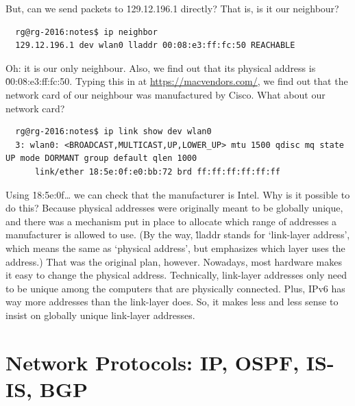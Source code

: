 But, can we send packets to \.{129.12.196.1} directly?
That is, is it our neighbour?
{\footnotesize
\begin{verbatim}
  rg@rg-2016:notes$ ip neighbor
  129.12.196.1 dev wlan0 lladdr 00:08:e3:ff:fc:50 REACHABLE
\end{verbatim}
}\noindent
Oh: it is our only neighbour.
Also, we find out that its physical address is \.{00:08:e3:ff:fc:50}.
Typing this in at \url{https://macvendors.com/},
  we find out that the network card of our neighbour was manufactured by Cisco.
What about our network card?
{\footnotesize
\begin{verbatim}
  rg@rg-2016:notes$ ip link show dev wlan0
  3: wlan0: <BROADCAST,MULTICAST,UP,LOWER_UP> mtu 1500 qdisc mq state UP mode DORMANT group default qlen 1000
      link/ether 18:5e:0f:e0:bb:72 brd ff:ff:ff:ff:ff:ff
\end{verbatim}
}\noindent
Using \.{18:5e:0f\dots} we can check that the manufacturer is Intel.
Why is it possible to do this?
Because physical addresses were originally meant to be globally unique,
  and there was a mechanism put in place to allocate
    which range of addresses a manufacturer is allowed to use.
(By the way, \.{lladdr} stands for `link-layer address',
  which means the same as `physical address',
  but emphasizes which layer uses the address.)
That was the original plan, however.
Nowadays, most hardware makes it easy to change the physical address.
Technically,
  link-layer addresses only need to be unique among the computers
  that are physically connected.
Plus, IPv6 has way more addresses than the link-layer does.
So, it makes less and less sense to insist on globally unique link-layer addresses.


\section{Network Protocols: IP, OSPF, IS-IS, BGP}

